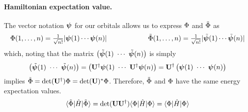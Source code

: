 \documentclass[11pt]{article}
\numberwithin{equation}{section}
\begin{document}
\paragraph{Hamiltonian expectation value.}
The vector notation $\bm\y$ for our orbitals allows us to express $\Phi $ and $\tilde{\Phi }$ as
\begin{align*}
  \F(1,\ld,n)
=
  \tfrac{1}{\sqrt{n!}}
  |\bm\y(1)\cd\bm\y(n)|
\sp\sp
  \tl\F(1,\ld,n)
=
  \tfrac{1}{\sqrt{n!}}
  |\tl{\bm\y}(1)\cd\tl{\bm\y}(n)|
\end{align*}
which, noting that the matrix $\ma{\tl{\bm\y}(1)\ \cd\ \tl{\bm\y}(n)}$ is simply
\begin{align*}
  \ma{\tl{\bm\y}(1)\ \cd\ \tl{\bm\y}(n)}
=
  \ma{\bo{U}\dg\bm\y(1)\ \cd\ \bo{U}\dg\bm\y(n)}
=
  \bo{U}\dg\ma{\bm\y(1)\ \cd\ \bm\y(n)}
\end{align*}
implies $\tilde{\Phi }=\det(\mathbf{U}^\dagger)\Phi =\det(\mathbf{U})^*\Phi $.
Therefore, $\tilde{\Phi }$ and $\Phi $ have the same energy expectation values.
\begin{align}
  \langle\tilde{\Phi }|\hat{H}|\tilde{\Phi }\rangle
=
  \det(\mathbf{U}\mathbf{U}^\dagger)\langle\Phi |\hat{H}|\Phi \rangle
=
  \langle\Phi |\hat{H}|\Phi \rangle
\end{align}
\end{document}
